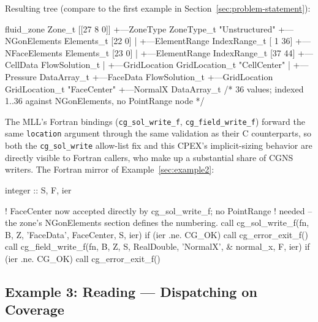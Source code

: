 \documentclass[11pt,letterpaper]{article}
\makeatletter
\let\cgns@orig@lstlisting\lstlisting
\let\cgns@endorig@lstlisting\endlstlisting
\renewenvironment{lstlisting}
  {\par\needspace{5\baselineskip}\nolinenumbers\cgns@orig@lstlisting}
  {\cgns@endorig@lstlisting\par\linenumbers}
\makeatother
\begin{document}
Resulting tree (compare to the first example in Section~\ref{sec:problem-statement}):

\begin{lstlisting}[language=C]
fluid_zone Zone_t [[27  8  0]]
+---ZoneType ZoneType_t "Unstructured"
+---NGonElements Elements_t [22  0]
|   +---ElementRange IndexRange_t [ 1 36]
+---NFaceElements Elements_t [23  0]
|   +---ElementRange IndexRange_t [37 44]
+---CellData FlowSolution_t
|   +---GridLocation GridLocation_t "CellCenter"
|   +---Pressure DataArray_t
+---FaceData FlowSolution_t
    +---GridLocation GridLocation_t "FaceCenter"
    +---NormalX DataArray_t     /* 36 values; indexed 1..36 against
                                    NGonElements, no PointRange node */
\end{lstlisting}

The MLL's Fortran bindings (\texttt{cg\_sol\_write\_f}, \texttt{cg\_field\_write\_f})
forward the same \texttt{location} argument through the same validation as
their C counterparts, so both the \texttt{cg\_sol\_write} allow-list fix
and this CPEX's implicit-sizing behavior are directly visible to Fortran
callers, who make up a substantial share of CGNS writers. The Fortran
mirror of Example~\ref{sec:example2}:

\begin{lstlisting}[language=Fortran]
integer :: S, F, ier

! FaceCenter now accepted directly by cg_sol_write_f; no PointRange
! needed -- the zone's NGonElements section defines the numbering.
call cg_sol_write_f(fn, B, Z, 'FaceData', FaceCenter, S, ier)
if (ier .ne. CG_OK) call cg_error_exit_f()
call cg_field_write_f(fn, B, Z, S, RealDouble, 'NormalX', &
                      normal_x, F, ier)
if (ier .ne. CG_OK) call cg_error_exit_f()
\end{lstlisting}

\subsection{Example 3: Reading --- Dispatching on Coverage}
\label{sec:example3}
\end{document}
